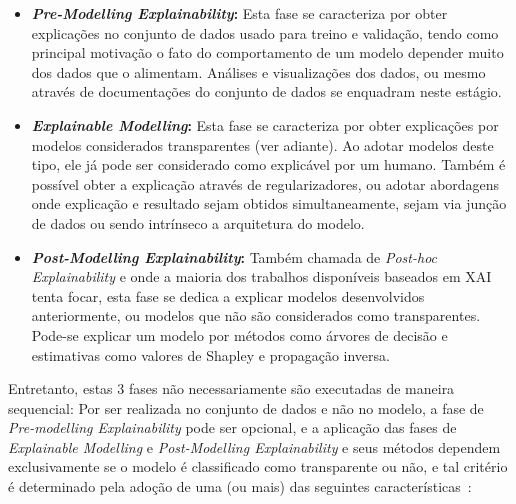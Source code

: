 \documentclass[portugues, 12pt, a4paper]{article}
\begin{document}
\begin{itemize}
\item \textbf{\textit{Pre-Modelling Explainability}:} Esta fase se caracteriza por obter explicações no conjunto de dados usado para treino e validação, tendo como principal motivação o fato do comportamento de um modelo depender muito dos dados que o alimentam. Análises e visualizações dos dados, ou mesmo através de documentações do conjunto de dados se enquadram neste estágio.~\citep{Khalegi_2019_Pre} 
\item \textbf{\textit{Explainable Modelling}:} Esta fase se caracteriza por obter explicações por modelos considerados transparentes (ver adiante). Ao adotar modelos deste tipo, ele já pode ser considerado como explicável por um humano. Também é possível obter a explicação através de regularizadores, ou adotar abordagens onde explicação e resultado sejam obtidos simultaneamente, sejam via junção de dados ou sendo intrínseco a arquitetura do modelo.~\citep{Khalegi_2019}
\item \textbf{\textit{Post-Modelling Explainability}:} Também chamada de \textit{Post-hoc Explainability} e onde a maioria dos trabalhos disponíveis baseados em XAI tenta focar, esta fase se dedica a explicar modelos desenvolvidos anteriormente, ou modelos que não são considerados como transparentes. Pode-se explicar um modelo por métodos como árvores de decisão e estimativas como valores de Shapley e propagação inversa.~\citep{Khalegi_2019_Post}
\end{itemize}

Entretanto, estas 3 fases não necessariamente são executadas de maneira sequencial: Por ser realizada no conjunto de dados e não no modelo, a fase de \textit{Pre-modelling Explainability} pode ser opcional, e a aplicação das fases de \textit{Explainable Modelling} e \textit{Post-Modelling Explainability} e seus métodos dependem exclusivamente se o modelo é classificado como transparente ou não, e tal critério é determinado pela adoção de uma (ou mais) das seguintes características~\citep{Arrieta_2020}:
\end{document}
